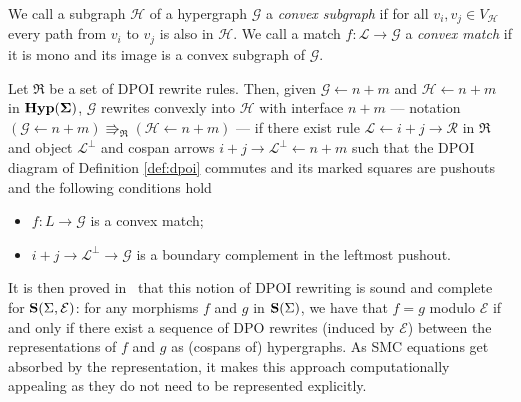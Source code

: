 \begin{definition}
We call a subgraph $\mathcal{H}$ of a hypergraph $\mathcal{G}$ a \emph{convex subgraph} if for all $v_i, v_j \in V_{\mathcal{H}}$ every path from $v_i$ to $v_j$ is also in $\mathcal{H}$.
We call a match $f : \mathcal L \to \mathcal G$ a \emph{convex match} if it is mono and its image is a convex subgraph of $\mathcal G$. 
   
\end{definition}

\begin{definition}
\label{def:convex_dpo}
Let $\mathfrak{R}$ be a set of DPOI rewrite rules. 
Then, given $\mathcal G \xleftarrow{} n+m$ and $\mathcal H \xleftarrow{} n + m$ in $\mathbf{Hyp(\Sigma)}$, $\mathcal G$ rewrites convexly into $\mathcal H$ with interface $n + m$ --- notation $(\mathcal G \xleftarrow{} n + m ) \Rrightarrow_{\mathfrak{R}}  (\mathcal H \xleftarrow{} n + m )$ --- if there exist rule $\mathcal L \xleftarrow{} i + j \xrightarrow{} \mathcal R$ in $\mathfrak{R}$ and object $\mathcal{L}^{\bot}$ and cospan arrows $i+j \xrightarrow{} \mathcal{L}^{\bot} \xleftarrow{} n+m$ such that the DPOI diagram of Definition \ref{def:dpoi} commutes and its marked squares are pushouts 
and the following conditions hold
\begin{itemize}
    \item $f : L \to \mathcal G$ is a convex match;
    \item $i + j \to \mathcal{L}^{\bot} \to \mathcal G$ is a boundary complement in the leftmost pushout.
\end{itemize}
\end{definition}
It is then proved in~\cite{bonchi_string_2022-2} that this notion of DPOI rewriting is sound and complete for $\mathbf{S}(\Sigma, \mathcal{E})$: for any morphisms $f$ and $g$ in $\mathbf{S}(\Sigma)$,  we have that $f = g$ modulo $\mathcal{E}$ if and only if there exist a sequence of DPO rewrites (induced by $\mathcal{E}$) between the representations of $f$ and $g$ as (cospans of) hypergraphs.
As SMC equations get absorbed by the representation, it makes this approach computationally appealing as they do not need to be represented explicitly.
